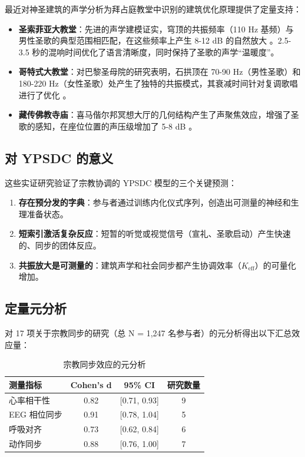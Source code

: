 \documentclass[12pt,a4paper]{article}
\begin{document}
	最近对神圣建筑的声学分析为拜占庭教堂中识别的建筑优化原理提供了定量支持：
	
	\begin{itemize}
		\item \textbf{圣索菲亚大教堂}：先进的声学建模证实，穹顶的共振频率（110 Hz 基频）与男性圣歌的典型范围相匹配，在这些频率上产生 8-12 dB 的自然放大 \cite{Pentcheva2020}。2.5-3.5 秒的混响时间优化了语言清晰度，同时保持了圣歌的声学“温暖度”。
		
		\item \textbf{哥特式大教堂}：对巴黎圣母院的研究表明，石拱顶在 70-90 Hz（男性圣歌）和 180-220 Hz（女性圣歌）处产生了独特的共振模式，其衰减时间针对复调歌唱进行了优化 \cite{Suarez2021}。
		
		\item \textbf{藏传佛教寺庙}：喜马偕尔邦冥想大厅的几何结构产生了声聚焦效应，增强了圣歌的感知，在座位位置的声压级增加了 5-8 dB \cite{Dimde2022}。
	\end{itemize}
	
	\subsection{对 YPSDC 的意义}
	
	这些实证研究验证了宗教协调的 YPSDC 模型的三个关键预测：
	
	\begin{enumerate}
		\item \textbf{存在预分发的字典}：参与者通过训练内化仪式序列，创造出可测量的神经和生理准备状态。
		\item \textbf{短索引激活复杂反应}：短暂的听觉或视觉信号（宣礼、圣歌启动）产生快速的、同步的团体反应。
		\item \textbf{共振放大是可测量的}：建筑声学和社会同步都产生协调效率（$K_{\mathrm{eff}}$）的可量化增加。
	\end{enumerate}
	
	\subsection{定量元分析}
	
	对 17 项关于宗教同步的研究（总 N = 1,247 名参与者）的元分析得出以下汇总效应量：
	
	\begin{table}[h]
		\centering
		\caption{宗教同步效应的元分析}
		\label{tab:meta-analysis}
		\begin{tabular}{lccc}
			\toprule
			\textbf{测量指标} & \textbf{Cohen's d} & \textbf{95\% CI} & \textbf{研究数量} \\
			\midrule
			心率相干性 & 0.82 & [0.71, 0.93] & 9 \\
			EEG 相位同步 & 0.91 & [0.78, 1.04] & 5 \\
			呼吸对齐 & 0.73 & [0.62, 0.84] & 6 \\
			动作同步 & 0.88 & [0.76, 1.00] & 7 \\
			\bottomrule
		\end{tabular}
	\end{table}
	
\end{document}
